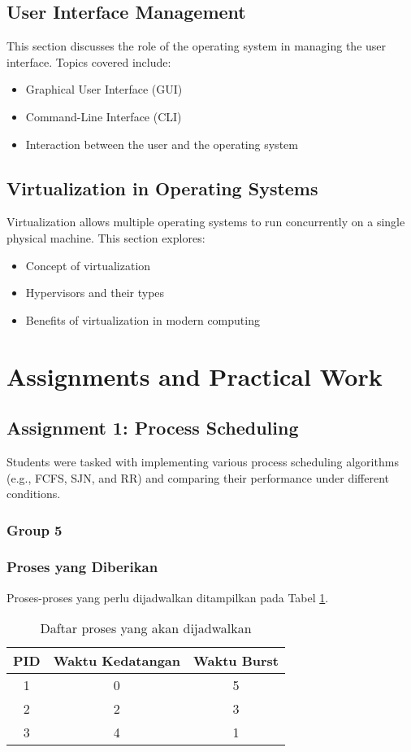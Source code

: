 \documentclass[12pt]{article}
\begin{document}
\subsection{User Interface Management}
This section discusses the role of the operating system in managing the user interface. Topics covered include:
\begin{itemize}
    \item Graphical User Interface (GUI)
    \item Command-Line Interface (CLI)
    \item Interaction between the user and the operating system
\end{itemize}

\subsection{Virtualization in Operating Systems}
Virtualization allows multiple operating systems to run concurrently on a single physical machine. This section explores:
\begin{itemize}
    \item Concept of virtualization
    \item Hypervisors and their types
    \item Benefits of virtualization in modern computing
\end{itemize}

\section{Assignments and Practical Work}
\subsection{Assignment 1: Process Scheduling}
Students were tasked with implementing various process scheduling algorithms (e.g., FCFS, SJN, and RR) and comparing their performance under different conditions.
\subsubsection{Group 5}
\subsubsection{Proses yang Diberikan}
Proses-proses yang perlu dijadwalkan ditampilkan pada Tabel \ref{tab:proses}.

\begin{table}[htbp]
    \centering
    \begin{tabular}{|c|c|c|}
        \hline
        PID & Waktu Kedatangan & Waktu Burst \\
        \hline
        1   & 0                & 5           \\
        2   & 2                & 3           \\
        3   & 4                & 1           \\
        \hline
    \end{tabular}
    \caption{Daftar proses yang akan dijadwalkan}
    \label{tab:proses}
\end{table}
\end{document}
